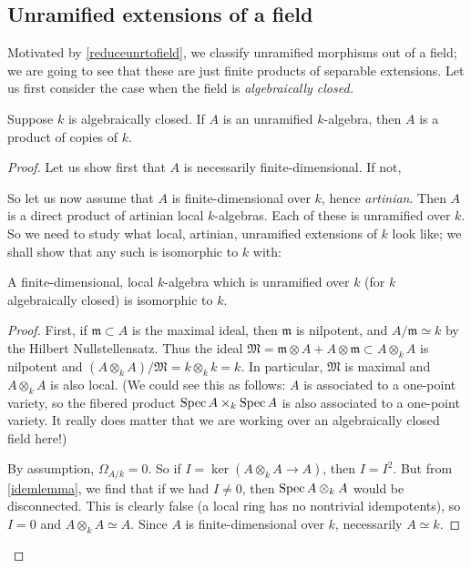 \subsection{Unramified extensions of a field}
Motivated by \cref{reduceunrtofield}, we classify unramified morphisms out of a
field; we are going to see that these are just finite products of separable
extensions. Let us first consider the case when the field is \emph{algebraically
closed.}

\begin{proposition} \label{unrextalgclosedfld}
Suppose $k$ is algebraically closed. If $A$ is an unramified $k$-algebra, then
$A$ is a product of copies of $k$.
\end{proposition} 
\begin{proof} 
Let us
show first that $A$ is necessarily finite-dimensional. 
If not, 


So let us now assume that $A$ is finite-dimensional over $k$, hence \emph{artinian}. 
Then $A$ is a direct product of artinian local $k$-algebras.
Each of these is unramified over $k$. So we need to study what local,
artinian, unramified extensions of $k$ look like; we shall show that any such
is isomorphic to $k$ with:

\begin{lemma} 
A finite-dimensional, local $k$-algebra which is unramified over $k$ (for $k$ 
algebraically closed) is isomorphic to $k$.
\end{lemma} 
\begin{proof} 
First, if $\mathfrak{m} \subset A$ is the maximal ideal, then $\mathfrak{m}$
is nilpotent, and $A/\mathfrak{m}\simeq k$ by the Hilbert Nullstellensatz. Thus the ideal
$\mathfrak{M}=\mathfrak{m}
\otimes A + A \otimes \mathfrak{m} \subset A \otimes_k A$ is nilpotent and
$(A \otimes_k A)/\mathfrak{M} = k \otimes_k k = k$. In particular, $\mathfrak{M}$ is maximal and
$A \otimes_k A$ is also local.
(We could see this as follows: $A$ is associated to a one-point variety, so the
fibered product $\operatorname{Spec} A \times_k \operatorname{Spec} A$ is also associated to a one-point
variety. It really does matter that we are working  over an
algebraically closed field here!)

By assumption, $\Omega_{A/k} = 0$. So if $I = \ker(A \otimes_k A \to A)$, then
$I = I^2$.
 But from \cref{idemlemma}, we find that if  we had $I \neq 0$, then $\operatorname{Spec} A \otimes_k A$
would be disconnected. This is clearly false (a local ring has no nontrivial
idempotents), so $I  = 0$ and 
$A \otimes_k A \simeq A$. Since $A$ is finite-dimensional over $k$,
necessarily $A \simeq k$.
\end{proof} 
\end{proof} 

